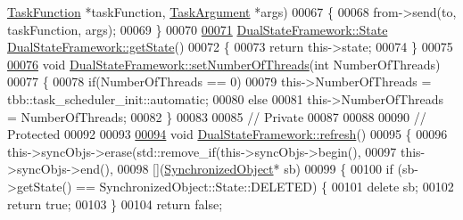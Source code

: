 \begin{DoxyCode}
      \hyperlink{namespacedsf_aa16e735f29587f4485b56fc46746f7a9}{TaskFunction} *taskFunction, \hyperlink{classyc_1_1_any}{TaskArgument} *args)
00067     \{
00068         from->send(to, taskFunction, args);
00069     \}
00070     
\hypertarget{_dual_state_framework_8cpp_source_l00071}{}\hyperlink{classdsf_1_1_dual_state_framework_aca55fd7ccccf9637aa4cd626cd2bbe58}{00071}     \hyperlink{classdsf_1_1_runnable_a8eb63b21a0accc7a6a2a05f18e257991}{DualStateFramework::State} 
      \hyperlink{classdsf_1_1_dual_state_framework_aca55fd7ccccf9637aa4cd626cd2bbe58}{DualStateFramework::getState}()
00072     \{
00073         \textcolor{keywordflow}{return} this->state;
00074     \}
00075     
\hypertarget{_dual_state_framework_8cpp_source_l00076}{}\hyperlink{classdsf_1_1_dual_state_framework_a8ab358a7456eeed264d53304b6562be4}{00076}     \textcolor{keywordtype}{void} \hyperlink{classdsf_1_1_dual_state_framework_a8ab358a7456eeed264d53304b6562be4}{DualStateFramework::setNumberOfThreads}(\textcolor{keywordtype}{int} NumberOfThreads)
00077     \{
00078         \textcolor{keywordflow}{if}(NumberOfThreads == 0)
00079             this->NumberOfThreads = tbb::task\_scheduler\_init::automatic;
00080         \textcolor{keywordflow}{else}
00081             this->NumberOfThreads = NumberOfThreads;
00082     \}
00083     
00085     \textcolor{comment}{// Private}
00087 \textcolor{comment}{}    
00088     
00090     \textcolor{comment}{// Protected}
00092 \textcolor{comment}{}
00093     
\hypertarget{_dual_state_framework_8cpp_source_l00094}{}\hyperlink{classdsf_1_1_dual_state_framework_afe53c4d52bfb56b0b73c6b9fd397b007}{00094}     \textcolor{keywordtype}{void} \hyperlink{classdsf_1_1_dual_state_framework_afe53c4d52bfb56b0b73c6b9fd397b007}{DualStateFramework::refresh}()
00095     \{
00096         this->syncObjs->erase(std::remove\_if(this->syncObjs->begin(),
00097                                              this->syncObjs->end(),
00098                                              [](\hyperlink{classdsf_1_1_synchronized_object}{SynchronizedObject}* sb)
00099                                              \{
00100                                                  \textcolor{keywordflow}{if} (sb->getState() == SynchronizedObject::State::DELETED) 
      \{
00101                                                      \textcolor{keyword}{delete} sb;
00102                                                      \textcolor{keywordflow}{return} \textcolor{keyword}{true};
00103                                                  \}
00104                                                  \textcolor{keywordflow}{return} \textcolor{keyword}{false};

\end{DoxyCode}
